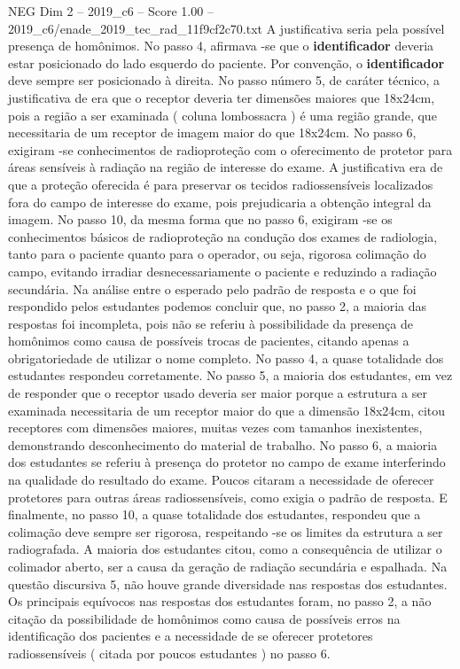 \begin{textsample}{NEG Dim 2 – 2019\_c6 – Score 1.00 – 2019\_c6/enade\_2019\_tec\_rad\_11f9cf2c70.txt}
A justificativa seria pela possível presença de homônimos.
No passo 4, afirmava -se que o \textbf{identificador} deveria estar posicionado do lado esquerdo do paciente.
Por convenção, o \textbf{identificador} deve sempre ser posicionado à direita.
No passo número 5, de caráter técnico, a justificativa de era que o receptor deveria ter dimensões maiores que 18x24cm, pois a região a ser examinada ( coluna lombossacra ) é uma região grande, que necessitaria de um receptor de imagem maior do que 18x24cm.
No passo 6, exigiram -se conhecimentos de radioproteção com o oferecimento de protetor para áreas sensíveis à radiação na região de interesse do exame.
A justificativa era de que a proteção oferecida é para preservar os tecidos radiossensíveis localizados fora do campo de interesse do exame, pois prejudicaria a obtenção integral da imagem.
No passo 10, da mesma forma que no passo 6, exigiram -se os conhecimentos básicos de radioproteção na condução dos exames de radiologia, tanto para o paciente quanto para o operador, ou seja, rigorosa colimação do campo, evitando irradiar desnecessariamente o paciente e reduzindo a radiação secundária.
Na análise entre o esperado pelo padrão de resposta e o que foi respondido pelos estudantes podemos concluir que, no passo 2, a maioria das respostas foi incompleta, pois não se referiu à possibilidade da presença de homônimos como causa de possíveis trocas de pacientes, citando apenas a obrigatoriedade de utilizar o nome completo.
No passo 4, a quase totalidade dos estudantes respondeu corretamente.
No passo 5, a maioria dos estudantes, em vez de responder que o receptor usado deveria ser maior porque a estrutura a ser examinada necessitaria de um receptor maior do que a dimensão 18x24cm, citou receptores com dimensões maiores, muitas vezes com tamanhos inexistentes, demonstrando desconhecimento do material de trabalho.
No passo 6, a maioria dos estudantes se referiu à presença do protetor no campo de exame interferindo na qualidade do resultado do exame.
Poucos citaram a necessidade de oferecer protetores para outras áreas radiossensíveis, como exigia o padrão de resposta.
E finalmente, no passo 10, a quase totalidade dos estudantes, respondeu que a colimação deve sempre ser rigorosa, respeitando -se os limites da estrutura a ser radiografada.
A maioria dos estudantes citou, como a consequência de utilizar o colimador aberto, ser a causa da geração de radiação secundária e espalhada.
Na questão discursiva 5, não houve grande diversidade nas respostas dos estudantes.
Os principais equívocos nas respostas dos estudantes foram, no passo 2, a não citação da possibilidade de homônimos como causa de possíveis erros na identificação dos pacientes e a necessidade de se oferecer protetores radiossensíveis ( citada por poucos estudantes ) no passo 6.

\end{textsample}

